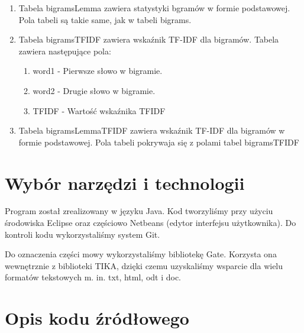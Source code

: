 \documentclass[11pt]{article}
\begin{document}
\begin{enumerate}
\begin{enumerate}
  \end{enumerate}
  \item Tabela bigramsLemma zawiera statystyki bgramów w formie podstawowej. Pola tabeli są takie same, jak w tabeli bigrams.
  \item Tabela bigramsTFIDF zawiera wskaźnik TF-IDF dla bigramów. Tabela zawiera następujące pola:
  \begin{enumerate}
     \item word1 - Pierwsze słowo w bigramie.
     \item word2 - Drugie słowo w bigramie.
     \item  TFIDF - Wartość wskaźnika TFIDF
  \end{enumerate}
  \item Tabela bigramsLemmaTFIDF zawiera wskaźnik TF-IDF dla bigramów w formie podstawowej.
  Pola tabeli pokrywaja się z polami tabel bigramsTFIDF
\end{enumerate}
\section{Wybór narzędzi i technologii}
Program został zrealizowany w języku Java.
Kod tworzyliśmy przy użyciu środowiska Eclipse oraz częściowo Netbeans (edytor interfejsu użytkownika).
Do kontroli kodu wykorzystaliśmy system Git.

Do oznaczenia części mowy wykorzystaliśmy bibliotekę Gate.
Korzysta ona wewnętrznie z biblioteki TIKA, dzięki czemu uzyskaliśmy wsparcie dla wielu formatów tekstowych m. in. txt, html, odt i doc.

\section{Opis kodu źródłowego}
\end{document}
